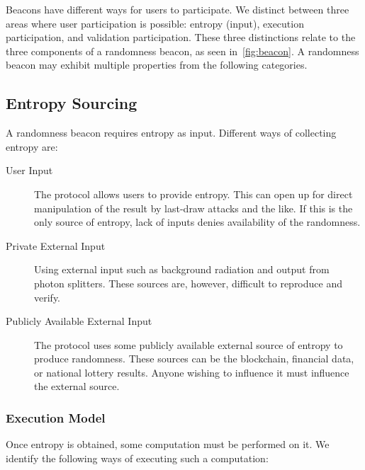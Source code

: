 Beacons have different ways for users to participate. We distinct between three areas where user participation is possible: entropy (input), execution participation, and validation participation. These three distinctions relate to the three components of a randomness beacon, as seen in~\vref{fig:beacon}. A randomness beacon may exhibit multiple properties from the following categories.

\subsection{Entropy Sourcing}
A randomness beacon requires entropy as input. Different ways of collecting entropy are:

\begin{description}
    \item [User Input] The protocol allows users to provide entropy. This can open up for direct manipulation of the result by last-draw attacks and the like. If this is the only source of entropy, lack of inputs denies availability of the randomness.
    \item [Private External Input] Using external input such as background radiation and output from photon splitters. These sources are, however, difficult to reproduce and verify.
    \item [Publicly Available External Input] The protocol uses some publicly available external source of entropy to produce randomness. These sources can be the blockchain, financial data, or national lottery results. Anyone wishing to influence it must influence the external source.
\end{description}

\subsubsection{Execution Model}
Once entropy is obtained, some computation must be performed on it. We identify the following ways of executing such a computation:

